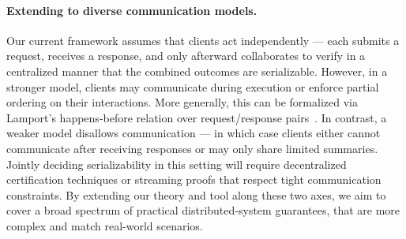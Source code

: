 

\paragraph{Extending to diverse communication models.}

Our current framework assumes that clients act independently --- each submits a request, receives a response, and only afterward collaborates to verify in a centralized manner that the combined outcomes are serializable. However, in a stronger model, clients may communicate during execution or enforce partial ordering on their interactions. More generally, this can be formalized via Lamport’s happens‐before relation over request/response pairs~\cite{La78}. 
%
In contrast, a weaker model disallows communication --- in which case clients either cannot communicate after receiving responses or may only share limited summaries. Jointly deciding serializability in this setting will require decentralized certification techniques or streaming proofs that respect tight communication constraints. 
%
By extending our theory and tool along these two axes, we aim to cover a broad spectrum of practical distributed‐system guarantees, that are more complex and match real-world scenarios.

%
%
%
